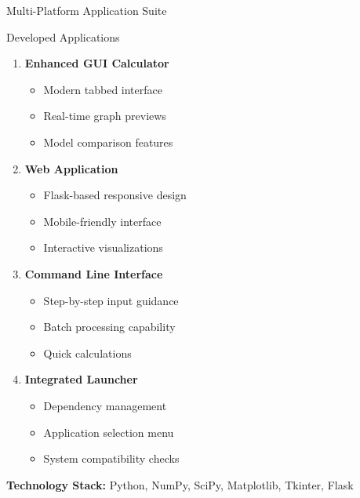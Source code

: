 \documentclass[aspectratio=169,14pt]{beamer}
\newcommand{\highlight}[1]{\textcolor{kentech_orange}{\textbf{#1}}}
\begin{document}
\begin{frame}{Multi-Platform Application Suite}
    \begin{block}{Developed Applications}
        \begin{enumerate}
            \item \highlight{Enhanced GUI Calculator}
                \begin{itemize}
                    \item Modern tabbed interface
                    \item Real-time graph previews
                    \item Model comparison features
                \end{itemize}
            
            \item \highlight{Web Application}
                \begin{itemize}
                    \item Flask-based responsive design
                    \item Mobile-friendly interface
                    \item Interactive visualizations
                \end{itemize}
            
            \item \highlight{Command Line Interface}
                \begin{itemize}
                    \item Step-by-step input guidance
                    \item Batch processing capability
                    \item Quick calculations
                \end{itemize}
            
            \item \highlight{Integrated Launcher}
                \begin{itemize}
                    \item Dependency management
                    \item Application selection menu
                    \item System compatibility checks
                \end{itemize}        \end{enumerate}
    \end{block}
    
    \begin{center}
        \textbf{Technology Stack:} Python, NumPy, SciPy, Matplotlib, Tkinter, Flask
    \end{center}
\end{frame}
\end{document}
